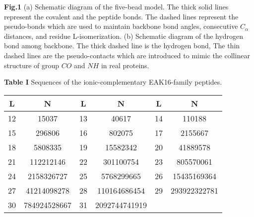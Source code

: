 \documentclass[preprint,preprintnumbers,amsmath,amssymb,showpacs,aps,pre]{revtex4-1}
\begin{document}
\newpage
\vspace{0.5cm}
\parindent 0pt {\large {\bf Fig.1}}
(a) Schematic diagram of the five-bead model. The thick solid lines
represent the covalent and the peptide bonds. The dashed lines
represent the pseudo-bonds which are used to maintain backbone bond
angles, consecutive $C_{\alpha}$ distances, and residue
L-isomerization. (b) Schematic diagram of the hydrogen bond among
backbone. The thick dashed line is the hydrogen bond, The thin
dashed lines are the pseudo-contacts which are introduced to mimic
the collinear structure of group $CO$ and $NH$ in real proteins.

\vspace{0.5cm}
\parindent 0pt {\large {\bf Table I}}
Sequences of the ionic-complementary EAK16-family peptides.

\newpage

\begin{table}
  \centering
  \begin{tabular}[t]{cc|cc|cc}
    \toprule
     L & N  & L & N & L & N \\
    \hline
     12 & 15037 &
     13 & 40617 &
     14 & 110188 \\
     15 & 296806 &
     16 & 802075 &
     17 & 2155667 \\
     18 & 5808335 &
     19 & 15582342 &
     20 & 41889578 \\
     21 & 112212146 &
     22 & 301100754 &
     23 & 805570061 \\
     24 & 2158326727 &
     25 & 5768299665 &
     26 & 15435169364 \\
     27 & 41214098278 &
     28 & 110164686454 &
     29 & 293922322781 \\
     30 & 784924528667 &
     31 & 2092744741919 &
        & \\
    \toprule
  \end{tabular}
\end{table}

\end{document}
